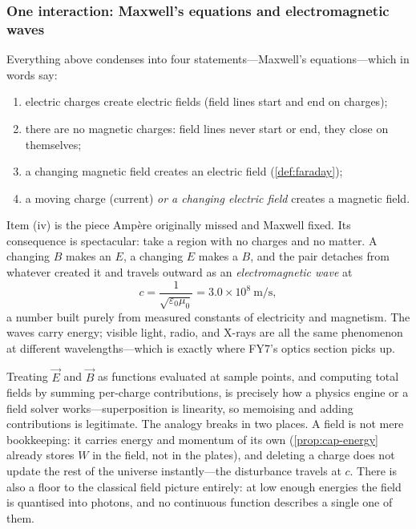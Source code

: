 \subsubsection{One interaction: Maxwell's equations and electromagnetic waves}

Everything above condenses into four statements---Maxwell's equations---which in words say:
\begin{enumerate}[label=(\roman*)]
  \item electric charges create electric fields (field lines start and end on charges);
  \item there are no magnetic charges: field lines never start or end, they close on themselves;
  \item a changing magnetic field creates an electric field (\cref{def:faraday});
  \item a moving charge (current) \emph{or a changing electric field} creates a magnetic field.
\end{enumerate}

Item (iv) is the piece Ampère originally missed and Maxwell fixed. Its consequence is spectacular: take a region with no charges and no matter. A changing $B$ makes an $E$, a changing $E$ makes a $B$, and the pair detaches from whatever created it and travels outward as an \emph{electromagnetic wave} at
\[
  c = \frac{1}{\sqrt{\varepsilon_0\mu_0}} = 3.0\times 10^{8}\ \mathrm{m/s},
\]
a number built purely from measured constants of electricity and magnetism. The waves carry energy; visible light, radio, and X-rays are all the same phenomenon at different wavelengths---which is exactly where FY7's optics section picks up.

\begin{remark}\label{rmk:analogy}
Treating $\vec{E}$ and $\vec{B}$ as functions evaluated at sample points, and computing total fields by summing per-charge contributions, is precisely how a physics engine or a field solver works---superposition is linearity, so memoising and adding contributions is legitimate. The analogy breaks in two places. A field is not mere bookkeeping: it carries energy and momentum of its own (\cref{prop:cap-energy} already stores $W$ in the field, not in the plates), and deleting a charge does not update the rest of the universe instantly---the disturbance travels at $c$. There is also a floor to the classical field picture entirely: at low enough energies the field is quantised into photons, and no continuous function describes a single one of them.
\end{remark}

